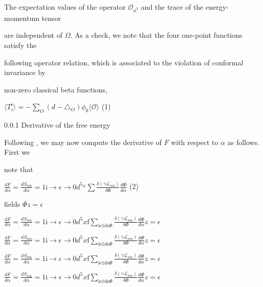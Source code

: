 \documentclass[a4paper,12pt]{article}
\begin{document}
The expectation values of the operator $\mathcal{O}_{\phi^{3}}$ and the trace of the energy-momentum tensor

are independent of $\Omega$. As a check, we note that the four one-point functions satisfy the

following operator relation, which is associated to the violation of conformal invariance by

non-zero classical beta functions,
\begin{center}
$\displaystyle \langle T_{i}^{i}\rangle=-\sum_{O}(d-\triangle_{O})\phi_{0}\langle \mathcal{O}\rangle$   (1)
\end{center}
0.0.1 Derivative of the free energy

Following , we may now compute the derivative of $F$ with respect to $\alpha$ as follows. First we

note that

$\displaystyle \frac{dF}{d\alpha} = \displaystyle \frac{dS_{\mathrm{r}\mathrm{e}\mathrm{n}}}{d\alpha} = 1\mathrm{i}\rightarrow\epsilon\rightarrow 0 d^{5_{X}} \displaystyle \sum \displaystyle \frac{\delta(\gamma \mathcal{L}_{\mathrm{r}\mathrm{e}\mathrm{n}})}{\delta\Phi}\frac{d\Phi}{d\alpha}$ (2)

fields $\Phi  z=\epsilon$

$\displaystyle \frac{dF}{d\alpha}=\frac{dS_{\mathrm{r}\mathrm{e}\mathrm{n}}}{d\alpha}=1\mathrm{i}\rightarrow\epsilon\rightarrow 0 d^{5}x\displaystyle \mathrm{f}\sum_{\mathrm{i}\mathrm{e}1\mathrm{d}\mathrm{s}\Phi}\frac{\delta(\gamma \mathcal{L}_{\mathrm{r}\mathrm{e}\mathrm{n}})}{\delta\Phi}\frac{d\Phi}{d\alpha}  z=\epsilon$

$\displaystyle \frac{dF}{d\alpha}=\frac{dS_{\mathrm{r}\mathrm{e}\mathrm{n}}}{d\alpha}=1\mathrm{i}\rightarrow\epsilon\rightarrow 0 d^{5}x\displaystyle \mathrm{f}\sum_{\mathrm{i}\mathrm{e}1\mathrm{d}\mathrm{s}\Phi}\frac{\delta(\gamma \mathcal{L}_{\mathrm{r}\mathrm{e}\mathrm{n}})}{\delta\Phi}\frac{d\Phi}{d\alpha}  z=\epsilon$

$\displaystyle \frac{dF}{d\alpha}=\frac{dS_{\mathrm{r}\mathrm{e}\mathrm{n}}}{d\alpha}=1\mathrm{i}\rightarrow\epsilon\rightarrow 0 d^{5}x\displaystyle \mathrm{f}\sum_{\mathrm{i}\mathrm{e}1\mathrm{d}\mathrm{s}\Phi}\frac{\delta(\gamma \mathcal{L}_{\mathrm{r}\mathrm{e}\mathrm{n}})}{\delta\Phi}\frac{d\Phi}{d\alpha}  z=\epsilon$

$\displaystyle \frac{dF}{d\alpha}=\frac{dS_{\mathrm{r}\mathrm{e}\mathrm{n}}}{d\alpha}=1\mathrm{i}\rightarrow\epsilon\rightarrow 0 d^{5}x\displaystyle \mathrm{f}\sum_{\mathrm{i}\mathrm{e}1\mathrm{d}\mathrm{s}\Phi}\frac{\delta(\gamma \mathcal{L}_{\mathrm{r}\mathrm{e}\mathrm{n}})}{\delta\Phi}\frac{d\Phi}{d\alpha}  z=\epsilon$
\end{document}
